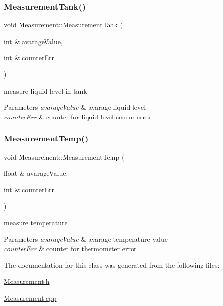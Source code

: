 \subsubsection{\texorpdfstring{Measurement\+Tank()}{MeasurementTank()}}
{\footnotesize\ttfamily void Measurement\+::\+Measurement\+Tank (\begin{DoxyParamCaption}\item[{int \&}]{avarage\+Value,  }\item[{int \&}]{counter\+Err }\end{DoxyParamCaption})}



measure liquid level in tank 


\begin{DoxyParams}{Parameters}
{\em avarage\+Value} & avarage liquid level \\
\hline
{\em counter\+Err} & counter for liquid level sensor error \\
\hline
\end{DoxyParams}
\mbox{\label{class_measurement_a2d1cbf9b660ac8110d4b0cb9155f684e}} 
\subsubsection{\texorpdfstring{Measurement\+Temp()}{MeasurementTemp()}}
{\footnotesize\ttfamily void Measurement\+::\+Measurement\+Temp (\begin{DoxyParamCaption}\item[{float \&}]{avarage\+Value,  }\item[{int \&}]{counter\+Err }\end{DoxyParamCaption})}



measure temperature 


\begin{DoxyParams}{Parameters}
{\em avarage\+Value} & avarage temperature value \\
\hline
{\em counter\+Err} & counter for thermometer error \\
\hline
\end{DoxyParams}


The documentation for this class was generated from the following files\+:\begin{DoxyCompactItemize}
\item 
\hyperlink{_measurement_8h}{Measurement.\+h}\item 
\hyperlink{_measurement_8cpp}{Measurement.\+cpp}\end{DoxyCompactItemize}
